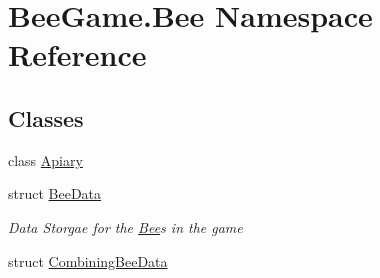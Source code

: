 \hypertarget{namespace_bee_game_1_1_bee}{}\section{Bee\+Game.\+Bee Namespace Reference}
\label{namespace_bee_game_1_1_bee}
\subsection*{Classes}
\begin{DoxyCompactItemize}
\item 
class \hyperlink{class_bee_game_1_1_bee_1_1_apiary}{Apiary}
\item 
struct \hyperlink{struct_bee_game_1_1_bee_1_1_bee_data}{Bee\+Data}
\begin{DoxyCompactList}\small\item\em Data Storgae for the \hyperlink{namespace_bee_game_1_1_bee}{Bee}\textquotesingle{}s in the game \end{DoxyCompactList}\item 
struct \hyperlink{struct_bee_game_1_1_bee_1_1_combining_bee_data}{Combining\+Bee\+Data}
\end{DoxyCompactItemize}

